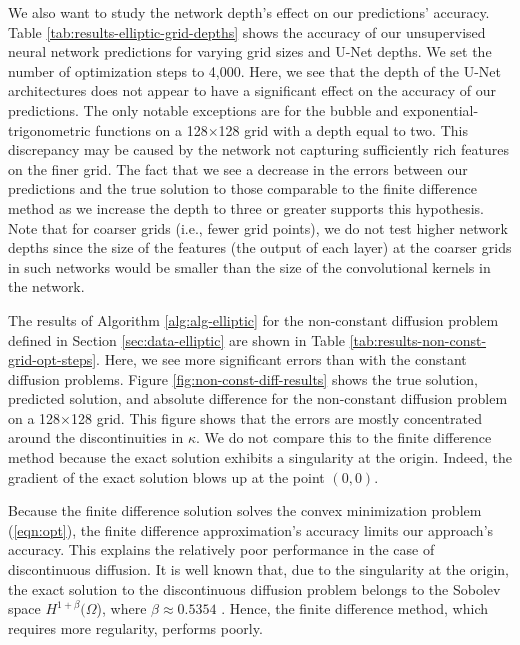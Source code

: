 \documentclass[preprint,12pt]{elsarticle}
\begin{document}
We also want to study the network depth's effect on our predictions' accuracy. Table \ref{tab:results-elliptic-grid-depths} shows the accuracy of our unsupervised neural network predictions for varying grid sizes and U-Net depths. We set the number of optimization steps to 4,000. Here, we see that the depth of the U-Net architectures does not appear to have a significant effect on the accuracy of our predictions. The only notable exceptions are for the bubble and exponential-trigonometric functions on a 128$\times$128 grid with a depth equal to two. This discrepancy may be caused by the network not capturing sufficiently rich features on the finer grid. The fact that we see a decrease in the errors between our predictions and the true solution to those comparable to the finite difference method as we increase the depth to three or greater supports this hypothesis. Note that for coarser grids (i.e., fewer grid points), we do not test higher network depths since the size of the features (the output of each layer) at the coarser grids in such networks would be smaller than the size of the convolutional kernels in the network.

The results of Algorithm \ref{alg:alg-elliptic} for the non-constant diffusion problem defined in Section \ref{sec:data-elliptic} are shown in Table \ref{tab:results-non-const-grid-opt-steps}. Here, we see more significant errors than with the constant diffusion problems. Figure \ref{fig:non-const-diff-results} shows the true solution, predicted solution, and absolute difference for the non-constant diffusion problem on a 128$\times$128 grid. This figure shows that the errors are mostly concentrated around the discontinuities in $\kappa$. We do not compare this to the finite difference method because the exact solution exhibits a singularity at the origin. Indeed, the gradient of the exact solution blows up at the point $(0,0)$. 

Because the finite difference solution solves the convex minimization problem (\ref{eqn:opt}), the finite difference approximation's accuracy limits our approach's accuracy. This explains the relatively poor performance in the case of discontinuous diffusion. It is well known that, due to the singularity at the origin, the exact solution to the discontinuous diffusion problem belongs to the Sobolev space $H^{1+\beta}(\Omega$), where $\beta \approx 0.5354$ \cite{riviere2003posteriori}. Hence, the finite difference method, which requires more regularity, performs poorly.
\end{document}
